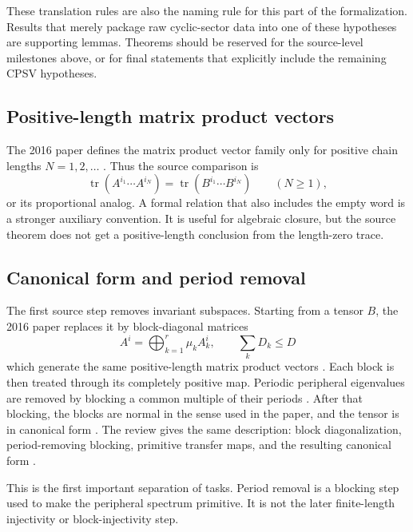 \documentclass{article}
\begin{document}
These translation rules are also the naming rule for this part of the
formalization. Results that merely package raw cyclic-sector data into one of
these hypotheses are supporting lemmas. Theorems should be reserved for the
source-level milestones above, or for final statements that explicitly include
the remaining CPSV hypotheses.

\subsection{Positive-length matrix product vectors}

The 2016 paper defines the matrix product vector family only for positive chain
lengths $N=1,2,\ldots$
\cite[Definition~\texttt{MPV}, source lines~130--151]{Cirac2016MPDO_arXiv}.
Thus the source comparison is
\[
  \operatorname{tr}(A^{i_1}\cdots A^{i_N})
  =
  \operatorname{tr}(B^{i_1}\cdots B^{i_N})
  \qquad (N \ge 1),
\]
or its proportional analog. A formal relation that also includes the empty
word is a stronger auxiliary convention. It is useful for algebraic closure, but
the source theorem does not get a positive-length conclusion from the
length-zero trace.

\subsection{Canonical form and period removal}

The first source step removes invariant subspaces. Starting from a tensor
$B$, the 2016 paper replaces it by block-diagonal matrices
\[
  A^i=\bigoplus_{k=1}^r \mu_k A_k^i,\qquad \sum_kD_k\le D
\]
which generate the same positive-length matrix product vectors
\cite[lines~214--225]{Cirac2016MPDO_arXiv}. Each block is then treated through
its completely positive map. Periodic peripheral eigenvalues are removed by
blocking a common multiple of their periods
\cite[lines~227--231]{Cirac2016MPDO_arXiv}. After that blocking, the blocks are
normal in the sense used in the paper, and the tensor is in canonical form
\cite[lines~233--255]{Cirac2016MPDO_arXiv}. The review gives the same
description: block diagonalization, period-removing blocking, primitive
transfer maps, and the resulting canonical form
\cite[lines~1793--1839]{Cirac2021Matrix}.

This is the first important separation of tasks. Period removal is a blocking
step used to make the peripheral spectrum primitive. It is not the later
finite-length injectivity or block-injectivity step.
\end{document}
